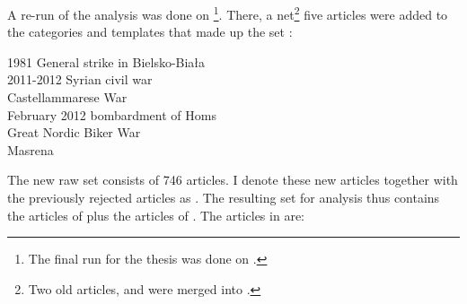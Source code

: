 A re-run of the analysis was done on \footnote{The final run for the thesis was done on .}.
There, a net\footnote{Two old articles,  and  were merged into .} five articles were added to the categories and templates that made up the set :

\begin{multicols}{2}\scriptsize
\setlength{\parindent}{0pt}
1981 General strike in Bielsko-Biała\\
2011-2012 Syrian civil war\\
Castellammarese War\\
February 2012 bombardment of Homs\\
Great Nordic Biker War\\
Masrena
\end{multicols}

The new raw set  consists of 746 articles. 
I denote these new articles together with the previously rejected articles as .
The resulting set for analysis  thus contains the articles of  plus the articles of .
The  articles in  are:

